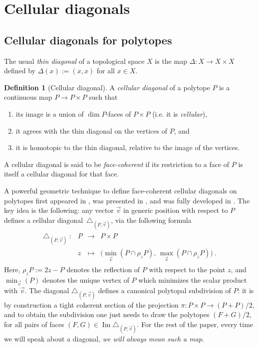 \documentclass{amsart}
\theoremstyle{definition}
\newtheorem{definition}[theorem]{Definition}
\DeclareMathOperator{\Ima}{Im} %
\begin{document}

\newpage
\section{Cellular diagonals}


\subsection{Cellular diagonals for polytopes}

The usual \emph{thin diagonal} of a topological space $X$ is the map $\Delta : X \to X \times X$ defined by $\Delta(x):=(x,x)$ for all $x \in X$.

\begin{definition}[Cellular diagonal]
    A \emph{cellular diagonal} of a polytope $P$ is a continuous map $P \to P \times P$ such that
    \begin{enumerate}
        \item its image is a union of $\dim P$-faces of $P\times P$ (i.e. it is \emph{cellular}),
        \item it agrees with the thin diagonal on the vertices of $P$, and
        \item it is homotopic to the thin diagonal, relative to the image of the vertices. 
    \end{enumerate}
    A cellular diagonal is said to be \emph{face-coherent} if its restriction to a face of $P$ is itself a cellular diagonal for that face. 
\end{definition}

A powerful geometric technique to define face-coherent cellular diagonals on polytopes first appeared in \cite{fultonIntersectionTheoryToric1997a}, was presented in \cite{masudaDiagonalAssociahedra2021}, and was fully developed in \cite{LA21}.
The key idea is the following: any vector $\vec v$ in generic position with respect to $P$ defines a cellular diagonal~$\triangle_{(P,\vec v)}$, via the following formula
\begin{align*}
    \begin{array}{rlcl}
    \triangle_{(P,\vec v)}\  : & P &\to  &P\times P\\
    &z & \mapsto& 
    \bigl(\min_{\vec v}(P\cap \rho_z P),\,  \max_{\vec v}(P\cap \rho_z P)\bigr) \ .
    \end{array}
\end{align*}
Here, $\rho_z P := 2z-P$ denotes the reflection of $P$ with respect to the point $z$, and $\min_{\vec v}(P)$ denotes the unique vertex of $P$ which minimizes the scalar product with $\vec v$. 
The diagonal $\triangle_{(P,\vec v)}$ defines a canonical polytopal subdivision of $P$: it is by construction a tight coherent section of the projection $\pi : P \times P \to (P+P)/2$, and to obtain the subdivision one just needs to draw the polytopes $(F+G)/2$, for all pairs of faces $(F,G) \in \Ima \triangle_{(P,\vec v)}$.
For the rest of the paper, every time we will speak about a diagonal, \emph{we will always mean such a map}. 
\end{document}
